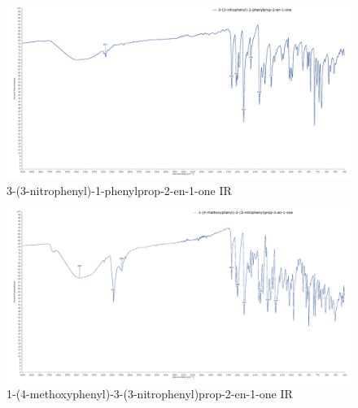 \documentclass[12pt]{article}
\begin{document}
\newpage
\begin{figure}[H]
    \centering
    \includegraphics[scale=0.234]{spectra/ir7.1.png}
    \caption{3-(3-nitrophenyl)-1-phenylprop-2-en-1-one IR}
\end{figure}
\begin{figure}[H]
    \centering
    \includegraphics[scale=0.234]{spectra/ir7.2.png}
    \caption{1-(4-methoxyphenyl)-3-(3-nitrophenyl)prop-2-en-1-one IR}
\end{figure}
\end{document}
